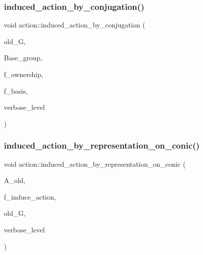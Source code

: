 \subsubsection{\texorpdfstring{induced\+\_\+action\+\_\+by\+\_\+conjugation()}{induced\_action\_by\_conjugation()}}
{\footnotesize\ttfamily void action\+::induced\+\_\+action\+\_\+by\+\_\+conjugation (\begin{DoxyParamCaption}\item[{\mbox{\hyperlink{classsims}{sims}} $\ast$}]{old\+\_\+G,  }\item[{\mbox{\hyperlink{classsims}{sims}} $\ast$}]{Base\+\_\+group,  }\item[{\mbox{\hyperlink{galois_8h_a09fddde158a3a20bd2dcadb609de11dc}{I\+NT}}}]{f\+\_\+ownership,  }\item[{\mbox{\hyperlink{galois_8h_a09fddde158a3a20bd2dcadb609de11dc}{I\+NT}}}]{f\+\_\+basis,  }\item[{\mbox{\hyperlink{galois_8h_a09fddde158a3a20bd2dcadb609de11dc}{I\+NT}}}]{verbose\+\_\+level }\end{DoxyParamCaption})}

\mbox{\label{classaction_a228538e3f07bc186db8eb5da8b90f617}} 
\subsubsection{\texorpdfstring{induced\+\_\+action\+\_\+by\+\_\+representation\+\_\+on\+\_\+conic()}{induced\_action\_by\_representation\_on\_conic()}}
{\footnotesize\ttfamily void action\+::induced\+\_\+action\+\_\+by\+\_\+representation\+\_\+on\+\_\+conic (\begin{DoxyParamCaption}\item[{\mbox{\hyperlink{classaction}{action}} $\ast$}]{A\+\_\+old,  }\item[{\mbox{\hyperlink{galois_8h_a09fddde158a3a20bd2dcadb609de11dc}{I\+NT}}}]{f\+\_\+induce\+\_\+action,  }\item[{\mbox{\hyperlink{classsims}{sims}} $\ast$}]{old\+\_\+G,  }\item[{\mbox{\hyperlink{galois_8h_a09fddde158a3a20bd2dcadb609de11dc}{I\+NT}}}]{verbose\+\_\+level }\end{DoxyParamCaption})}

